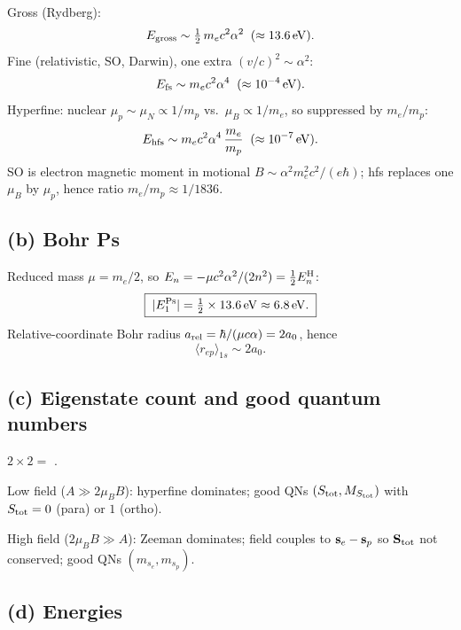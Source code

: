 \documentclass[11pt]{article}
\begin{document}
Gross (Rydberg):
\begin{equation}
E_{\rm gross} \sim \tfrac12\, m_e c^{2}\alpha^{2}\;\;(\approx \SI{13.6}{eV}).
\end{equation}
Fine (relativistic, SO, Darwin), one extra $(v/c)^2\sim\alpha^2$:
\begin{equation}
E_{\rm fs} \sim m_e c^{2}\alpha^{4}\;\;(\approx \SI{e-4}{eV}).
\end{equation}
Hyperfine: nuclear $\mu_p\sim\mu_N\propto 1/m_p$ vs.\ $\mu_B\propto 1/m_e$, so suppressed by $m_e/m_p$:
\begin{equation}
E_{\rm hfs} \sim m_e c^{2}\alpha^{4}\,\frac{m_e}{m_p}\;\;(\approx \SI{e-7}{eV}).
\end{equation}
SO is electron magnetic moment in motional $B\sim\alpha^2 m_e^2 c^2/(e\hbar)$; hfs replaces one $\mu_B$ by $\mu_p$, hence ratio $m_e/m_p\approx 1/1836$.

\subsection*{(b) Bohr Ps}

Reduced mass $\mu=m_e/2$, so $E_n=-\mu c^2\alpha^2/(2n^2)=\tfrac12 E_n^{\rm H}$:
\begin{equation}
\boxed{\;|E_1^{\rm Ps}| = \tfrac12 \times \SI{13.6}{eV}\approx \SI{6.8}{eV}.\;}
\end{equation}
Relative-coordinate Bohr radius $a_{\rm rel}=\hbar/(\mu c\alpha)=2a_0$, hence
\begin{equation}
\boxed{\;\langle r_{ep}\rangle_{1s} \sim 2 a_0.\;}
\end{equation}

\subsection*{(c) Eigenstate count and good quantum numbers}

$2\times 2=$ .

Low field ($A\gg 2\mu_B B$): hyperfine dominates; good QNs $(S_{\rm tot},M_{S_{\rm tot}})$ with $S_{\rm tot}=0$ (para) or $1$ (ortho).

High field ($2\mu_B B\gg A$): Zeeman dominates; field couples to $\vb s_e-\vb s_p$ so $\vb S_{\rm tot}$ not conserved; good QNs $(m_{s_e},m_{s_p})$.

\subsection*{(d) Energies}
\end{document}
